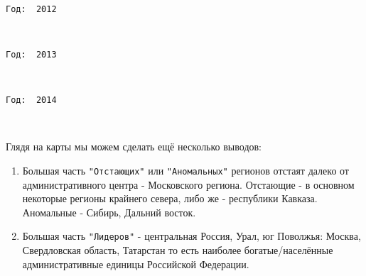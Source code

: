 \documentclass[11pt]{article}
\begin{document}
    \begin{center}
    \end{center}
    { \hspace*{\fill} \\}
    
    \begin{Verbatim}[commandchars=\\\{\}]
Год:  2012

    \end{Verbatim}

    \begin{center}
    \end{center}
    { \hspace*{\fill} \\}
    
    \begin{Verbatim}[commandchars=\\\{\}]
Год:  2013

    \end{Verbatim}

    \begin{center}
    \end{center}
    { \hspace*{\fill} \\}
    
    \begin{Verbatim}[commandchars=\\\{\}]
Год:  2014

    \end{Verbatim}

    \begin{center}
    \end{center}
    { \hspace*{\fill} \\}
    
    Глядя на карты мы можем сделать ещё несколько выводов:

\begin{enumerate}
\item Большая часть \verb'"Отстающих"' или \verb'"Аномальных"' регионов отстаят далеко от административного центра - Московского региона. Отстающие - в основном некоторые регионы крайнего севера, либо же - республики Кавказа. Аномальные - Сибирь, Дальний восток.
\item Большая часть \verb'"Лидеров"' - центральная Россия, Урал, юг Поволжья: Москва, Свердловская область, Татарстан то есть наиболее богатые/населённые  административные единицы Российской Федерации.
\end{enumerate}
\end{document}
